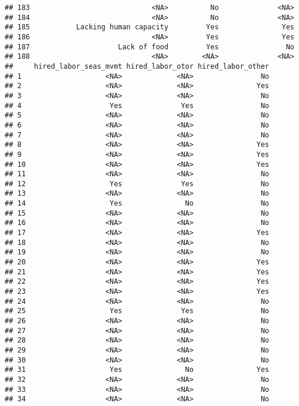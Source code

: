 \documentclass[
]{article}
\begin{document}
\begin{verbatim}
## 183                             <NA>          No              <NA>
## 184                             <NA>          No              <NA>
## 185           Lacking human capacity         Yes               Yes
## 186                             <NA>         Yes               Yes
## 187                     Lack of food         Yes                No
## 188                             <NA>        <NA>              <NA>
##     hired_labor_seas_mvmt hired_labor_otor hired_labor_other
## 1                    <NA>             <NA>                No
## 2                    <NA>             <NA>               Yes
## 3                    <NA>             <NA>                No
## 4                     Yes              Yes                No
## 5                    <NA>             <NA>                No
## 6                    <NA>             <NA>                No
## 7                    <NA>             <NA>                No
## 8                    <NA>             <NA>               Yes
## 9                    <NA>             <NA>               Yes
## 10                   <NA>             <NA>               Yes
## 11                   <NA>             <NA>                No
## 12                    Yes              Yes                No
## 13                   <NA>             <NA>                No
## 14                    Yes               No                No
## 15                   <NA>             <NA>                No
## 16                   <NA>             <NA>                No
## 17                   <NA>             <NA>               Yes
## 18                   <NA>             <NA>                No
## 19                   <NA>             <NA>                No
## 20                   <NA>             <NA>               Yes
## 21                   <NA>             <NA>               Yes
## 22                   <NA>             <NA>               Yes
## 23                   <NA>             <NA>               Yes
## 24                   <NA>             <NA>                No
## 25                    Yes              Yes                No
## 26                   <NA>             <NA>                No
## 27                   <NA>             <NA>                No
## 28                   <NA>             <NA>                No
## 29                   <NA>             <NA>                No
## 30                   <NA>             <NA>                No
## 31                    Yes               No               Yes
## 32                   <NA>             <NA>                No
## 33                   <NA>             <NA>                No
## 34                   <NA>             <NA>                No

\end{verbatim}
\end{document}
